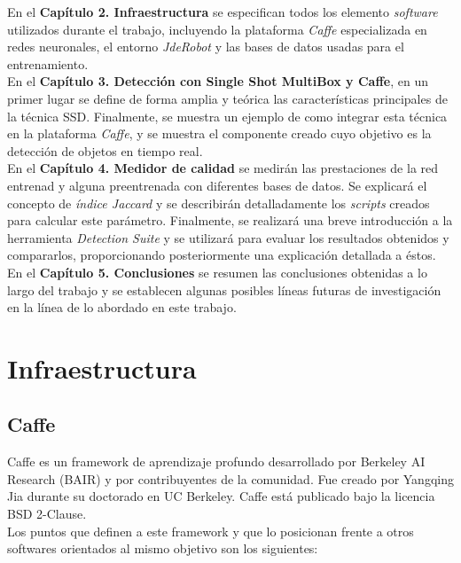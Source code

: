 \documentclass[a4paper, 12pt, oneside]{book}
\begin{document}
En el \textbf{Capítulo 2. Infraestructura} se especifican todos los elemento \textit{software} utilizados durante el trabajo, incluyendo la plataforma \textit{Caffe} especializada en redes neuronales, el entorno \textit{JdeRobot} y las bases de datos usadas para el entrenamiento.\\

En el \textbf{Capítulo 3. Detección con Single Shot MultiBox y Caffe}, en un primer lugar se define  de forma amplia y teórica las características principales de la técnica SSD. Finalmente, se muestra un ejemplo de como integrar esta técnica en la plataforma \textit{Caffe}, y se muestra el componente creado cuyo objetivo es la detección de objetos en tiempo real.\\

En el \textbf{Capítulo 4. Medidor de calidad} se medirán las prestaciones de la red entrenad y alguna preentrenada con diferentes bases de datos. Se explicará el concepto de \textit{índice Jaccard} y se describirán detalladamente los \textit{scripts} creados para calcular este parámetro. Finalmente, se realizará una breve introducción a la herramienta \textit{Detection Suite} y se utilizará para evaluar los resultados obtenidos y compararlos, proporcionando posteriormente una explicación detallada a éstos.\\

En el \textbf{Capítulo 5. Conclusiones} se resumen las conclusiones obtenidas a lo largo del trabajo y se establecen algunas posibles líneas futuras de investigación en la línea de lo abordado en este trabajo.

\chapter{Infraestructura}

\section{Caffe}

Caffe es un framework de aprendizaje profundo desarrollado por Berkeley AI Research (BAIR) y por contribuyentes de la comunidad. Fue creado por Yangqing Jia durante su doctorado en UC Berkeley. Caffe está publicado bajo la licencia BSD 2-Clause.\\

Los puntos que definen a este framework y que lo posicionan frente a otros softwares orientados al mismo objetivo son los siguientes:
\end{document}
